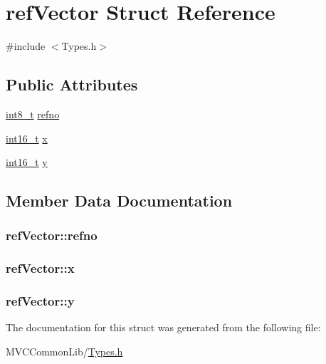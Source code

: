 \hypertarget{structref_vector}{
\section{refVector Struct Reference}
\label{structref_vector}
}


{\ttfamily \#include $<$Types.h$>$}

\subsection*{Public Attributes}
\begin{DoxyCompactItemize}
\item 
\hyperlink{_types_8h_aaf02e775ead73e138f20f66b2846671d}{int8\_\-t} \hyperlink{structref_vector_a87a1d38b9e235b983b82abd3a0eb47ab}{refno}
\item 
\hyperlink{_types_8h_ae615613535a2b2445773922f5d45a861}{int16\_\-t} \hyperlink{structref_vector_adeb9dca3f08b25112b9f6bccb5002f48}{x}
\item 
\hyperlink{_types_8h_ae615613535a2b2445773922f5d45a861}{int16\_\-t} \hyperlink{structref_vector_a899825821ce74c5622ea369e32dcf67c}{y}
\end{DoxyCompactItemize}


\subsection{Member Data Documentation}
\hypertarget{structref_vector_a87a1d38b9e235b983b82abd3a0eb47ab}{
\subsubsection[{refno}]{ {\bf refVector::refno}}}
\label{structref_vector_a87a1d38b9e235b983b82abd3a0eb47ab}
\hypertarget{structref_vector_adeb9dca3f08b25112b9f6bccb5002f48}{
\subsubsection[{x}]{ {\bf refVector::x}}}
\label{structref_vector_adeb9dca3f08b25112b9f6bccb5002f48}
\hypertarget{structref_vector_a899825821ce74c5622ea369e32dcf67c}{
\subsubsection[{y}]{ {\bf refVector::y}}}
\label{structref_vector_a899825821ce74c5622ea369e32dcf67c}


The documentation for this struct was generated from the following file:\begin{DoxyCompactItemize}
\item 
MVCCommonLib/\hyperlink{_types_8h}{Types.h}\end{DoxyCompactItemize}

